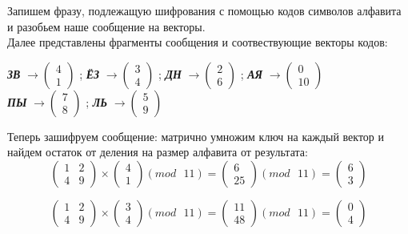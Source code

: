 \documentclass[a5paper, 10pt]{article}
\theoremstyle{definition}
\theoremstyle{plain}
\theoremstyle{remark}
\begin{document}
Запишем фразу, подлежащую шифрования с помощью кодов символов алфавита и разобьем наше сообщение на векторы. \\
Далее представлены фрагменты сообщения и соотвествующие векторы кодов:
\begin{center}
\textbf{\textit{ЗВ}} $\to \begin{pmatrix}
 4\\
1
\end{pmatrix}$ ;
\textbf{\textit{ЁЗ}}  $\to \begin{pmatrix}
 3\\
4
\end{pmatrix}$ ;
\textbf{\textit{ДН}}  $\to \begin{pmatrix}
 2\\
6
\end{pmatrix}$ ;
\textbf{\textit{АЯ}}  $\to \begin{pmatrix}
 0\\
10
\end{pmatrix}$ \\
\textbf{\textit{ПЫ}}  $\to \begin{pmatrix}
 7\\
8
\end{pmatrix}$ ;
\textbf{\textit{ЛЬ}}  $\to \begin{pmatrix}
 5\\
9
\end{pmatrix}$ \\
\end{center}

Теперь зашифруем сообщение: матрично умножим ключ на каждый вектор и найдем остаток от деления на размер алфавита от результата:
\begin{equation}
\begin{pmatrix}
1 & 2 \\
4 & 9
\end{pmatrix}
 \times
\begin{pmatrix}
 4\\
1
\end{pmatrix}
(mod \text{ }11)
= 
\begin{pmatrix}
 6\\
25
\end{pmatrix}
(mod \text{ }11)
= \begin{pmatrix}
 6\\
3
\end{pmatrix}
\end{equation}

\begin{equation}
\begin{pmatrix}
1 & 2 \\
4 & 9
\end{pmatrix}
 \times
\begin{pmatrix}
 3\\
4
\end{pmatrix}
(mod \text{ }11)
= 
\begin{pmatrix}
 11\\
48
\end{pmatrix}
(mod \text{ }11)
= \begin{pmatrix}
 0\\
4
\end{pmatrix}
\end{equation}
\end{document}
